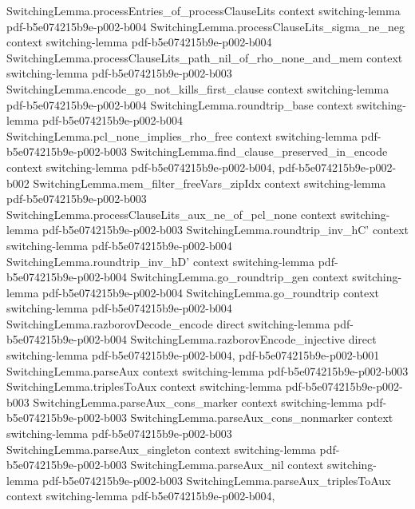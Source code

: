 \begin{lemma}
\proofstep
  {SwitchingLemma.processEntries_of_processClauseLits}
  {context}
  {switching-lemma}
  {pdf-b5e074215b9e-p002-b004}
\proofstep
  {SwitchingLemma.processClauseLits_sigma_ne_neg}
  {context}
  {switching-lemma}
  {pdf-b5e074215b9e-p002-b004}
\proofstep
  {SwitchingLemma.processClauseLits_path_nil_of_rho_none_and_mem}
  {context}
  {switching-lemma}
  {pdf-b5e074215b9e-p002-b003}
\proofstep
  {SwitchingLemma.encode_go_not_kills_first_clause}
  {context}
  {switching-lemma}
  {pdf-b5e074215b9e-p002-b004}
\proofstep
  {SwitchingLemma.roundtrip_base}
  {context}
  {switching-lemma}
  {pdf-b5e074215b9e-p002-b004}
\proofstep
  {SwitchingLemma.pcl_none_implies_rho_free}
  {context}
  {switching-lemma}
  {pdf-b5e074215b9e-p002-b003}
\proofstep
  {SwitchingLemma.find_clause_preserved_in_encode}
  {context}
  {switching-lemma}
  {pdf-b5e074215b9e-p002-b004,
    pdf-b5e074215b9e-p002-b002}
\proofstep
  {SwitchingLemma.mem_filter_freeVars_zipIdx}
  {context}
  {switching-lemma}
  {pdf-b5e074215b9e-p002-b003}
\proofstep
  {SwitchingLemma.processClauseLits_aux_ne_of_pcl_none}
  {context}
  {switching-lemma}
  {pdf-b5e074215b9e-p002-b003}
\proofstep
  {SwitchingLemma.roundtrip_inv_hC'}
  {context}
  {switching-lemma}
  {pdf-b5e074215b9e-p002-b004}
\proofstep
  {SwitchingLemma.roundtrip_inv_hD'}
  {context}
  {switching-lemma}
  {pdf-b5e074215b9e-p002-b004}
\proofstep
  {SwitchingLemma.go_roundtrip_gen}
  {context}
  {switching-lemma}
  {pdf-b5e074215b9e-p002-b004}
\proofstep
  {SwitchingLemma.go_roundtrip}
  {context}
  {switching-lemma}
  {pdf-b5e074215b9e-p002-b004}
\proofstep
  {SwitchingLemma.razborovDecode_encode}
  {direct}
  {switching-lemma}
  {pdf-b5e074215b9e-p002-b004}
\proofstep
  {SwitchingLemma.razborovEncode_injective}
  {direct}
  {switching-lemma}
  {pdf-b5e074215b9e-p002-b004,
    pdf-b5e074215b9e-p002-b001}
\proofstep
  {SwitchingLemma.parseAux}
  {context}
  {switching-lemma}
  {pdf-b5e074215b9e-p002-b003}
\proofstep
  {SwitchingLemma.triplesToAux}
  {context}
  {switching-lemma}
  {pdf-b5e074215b9e-p002-b003}
\proofstep
  {SwitchingLemma.parseAux_cons_marker}
  {context}
  {switching-lemma}
  {pdf-b5e074215b9e-p002-b003}
\proofstep
  {SwitchingLemma.parseAux_cons_nonmarker}
  {context}
  {switching-lemma}
  {pdf-b5e074215b9e-p002-b003}
\proofstep
  {SwitchingLemma.parseAux_singleton}
  {context}
  {switching-lemma}
  {pdf-b5e074215b9e-p002-b003}
\proofstep
  {SwitchingLemma.parseAux_nil}
  {context}
  {switching-lemma}
  {pdf-b5e074215b9e-p002-b003}
\proofstep
  {SwitchingLemma.parseAux_triplesToAux}
  {context}
  {switching-lemma}
  {pdf-b5e074215b9e-p002-b004,
}
\end{lemma}
